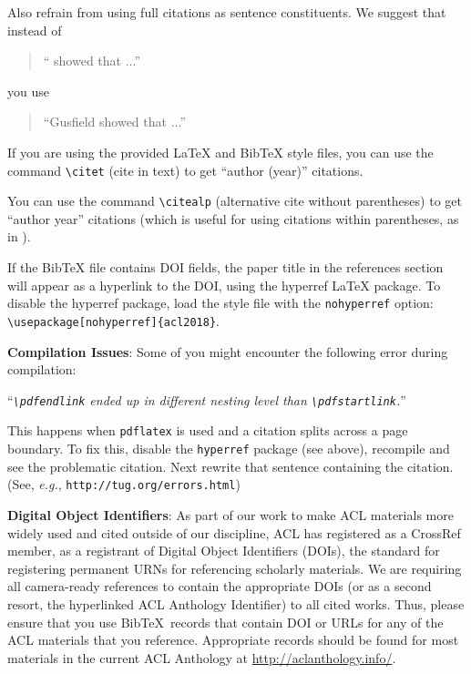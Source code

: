 \documentclass[11pt,a4paper]{article}
\begin{document}
Also refrain from using full citations
as sentence constituents.
We suggest that instead of
\begin{quote}
  ``\cite{Gusfield:97} showed that ...''
\end{quote}
you use
\begin{quote}
``Gusfield    showed that ...''
\end{quote}

If you are using the provided \LaTeX{} and Bib\TeX{} style files, you
can use the command \verb|\citet| (cite in text)
to get ``author (year)'' citations.

You can use the command \verb|\citealp| (alternative cite without 
parentheses) to get ``author year'' citations (which is useful for 
using citations within parentheses, as in \citealp{Gusfield:97}).

If the Bib\TeX{} file contains DOI fields, the paper
title in the references section will appear as a hyperlink
to the DOI, using the hyperref \LaTeX{} package.
To disable the hyperref package, load the style file
with the \verb|nohyperref| option:
\verb|\usepackage[nohyperref]{acl2018}|.

\textbf{Compilation Issues}: Some of you might encounter the following error during compilation: 

``{\em \verb|\pdfendlink| ended up in different nesting level than \verb|\pdfstartlink|.}''

This happens when \verb|pdflatex| is used and a citation splits across a page boundary. To fix this, disable the \verb|hyperref| package (see above), recompile and see the problematic citation.
Next rewrite that sentence containing the citation. (See, {\em e.g.}, {\small\tt http://tug.org/errors.html})

\textbf{Digital Object Identifiers}:  As part of our work to make ACL
materials more widely used and cited outside of our discipline, ACL
has registered as a CrossRef member, as a registrant of Digital Object
Identifiers (DOIs), the standard for registering permanent URNs for
referencing scholarly materials. We are requiring all
camera-ready references to contain the appropriate DOIs (or as a
second resort, the hyperlinked ACL Anthology Identifier) to all cited
works.  Thus, please ensure that you use Bib\TeX\ records that contain
DOI or URLs for any of the ACL materials that you reference.
Appropriate records should be found for most materials in the current
ACL Anthology at \url{http://aclanthology.info/}.
\end{document}
